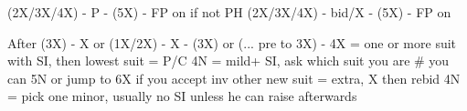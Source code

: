 (2X/3X/4X) - P - (5X) - FP on if not PH
(2X/3X/4X) - bid/X - (5X) - FP on

After (3X) - X or (1X/2X) - X - (3X) or (... pre to 3X) -
4X = one or more suit with SI, then 
    lowest suit = P/C
    4N = mild+ SI, ask which suit you are  # you can 5N or jump to 6X if you accept inv
    other new suit = extra, X then rebid
4N = pick one minor, usually no SI unless he can raise afterwards
